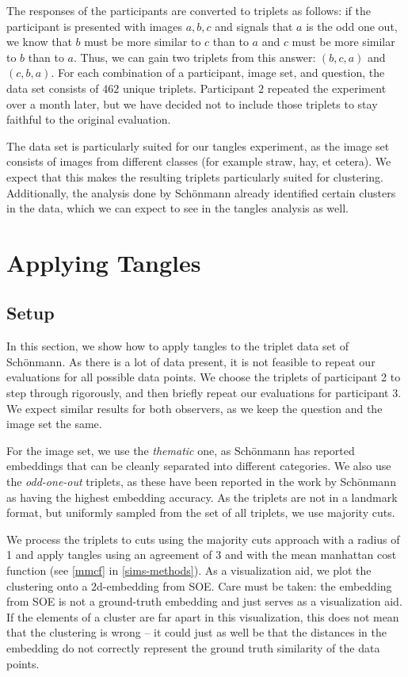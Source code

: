 The responses of the participants are converted to triplets as follows: if the participant is presented with images $a, b, c$ and signals that $a$ is the odd one out, 
we know that $b$ must be more similar to $c$ than to $a$ and $c$ must be more similar to $b$ than to $a$. Thus, we can gain two triplets from this answer: $(b,c,a)$ and $(c,b,a)$.
For each combination of a participant, image set, and question, the data set consists of $462$ unique triplets. 
Participant $2$ repeated the experiment over a month later, but we have decided not to include those triplets to stay faithful to the original evaluation.

The data set is particularly suited for our tangles experiment, as the image set consists of images from different classes (for example straw, hay, et cetera). 
We expect that this makes the resulting triplets particularly suited for clustering. Additionally, the analysis done by Schönmann already identified certain 
clusters in the data, which we can expect to see in the tangles analysis as well.

\section{Applying Tangles}
\subsection{Setup}
In this section, we show how to apply tangles to the triplet data set of Schönmann.
As there is a lot of data present, it is not feasible to repeat our evaluations for all possible data points.
We choose the triplets of participant 2 to step through rigorously, and then briefly repeat our evaluations for participant 3. We expect similar results for both observers,
as we keep the question and the image set the same.

For the image set, we use the \textit{thematic} one, as Schönmann has reported embeddings that can be cleanly 
separated into different categories.  We also use the \textit{odd-one-out} triplets, as these have been reported in the work by Schönmann as 
having the highest embedding accuracy. As the triplets are not in a landmark format, but uniformly sampled from the set of all triplets, we use majority cuts. 

We process the triplets to cuts using the majority cuts approach with a radius of 1 and apply tangles using an agreement of 3 and with the mean manhattan cost function (see \autoref{mmcf} in \autoref{sims-methods}). 
As a visualization aid, we plot the clustering onto a 2d-embedding from SOE. Care must be taken: the embedding
from SOE is not a ground-truth embedding and just serves as a visualization aid. If the elements of a cluster are far 
apart in this visualization, this does not mean that the clustering is wrong – it could just as well be that the distances in the embedding do not correctly 
represent the ground truth similarity of the data points.

